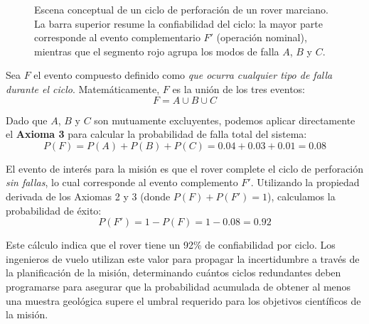 \begin{figure}[htbp]
\caption{Escena conceptual de un ciclo de perforación de un rover marciano. La barra superior resume la confiabilidad del ciclo: la mayor parte corresponde al evento complementario $F'$ (operación nominal), mientras que el segmento rojo agrupa los modos de falla $A$, $B$ y $C$.}
\end{figure}

Sea $F$ el evento compuesto definido como \textit{que ocurra cualquier tipo de falla durante el ciclo}. Matemáticamente, $F$ es la unión de los tres eventos:
$$ F = A \cup B \cup C $$

Dado que $A$, $B$ y $C$ son mutuamente excluyentes, podemos aplicar directamente el \textbf{Axioma 3} para calcular la probabilidad de falla total del sistema:
$$ P(F) = P(A) + P(B) + P(C) = 0.04 + 0.03 + 0.01 = 0.08 $$

El evento de interés para la misión es que el rover complete el ciclo de perforación \textit{sin fallas}, lo cual corresponde al evento complemento $F'$. Utilizando la propiedad derivada de los Axiomas 2 y 3 (donde $P(F) + P(F') = 1$), calculamos la probabilidad de éxito:
$$ P(F') = 1 - P(F) = 1 - 0.08 = 0.92 $$

Este cálculo indica que el rover tiene un 92\% de confiabilidad por ciclo. Los ingenieros de vuelo utilizan este valor para propagar la incertidumbre a través de la planificación de la misión, determinando cuántos ciclos redundantes deben programarse para asegurar que la probabilidad acumulada de obtener al menos una muestra geológica supere el umbral requerido para los objetivos científicos de la misión.